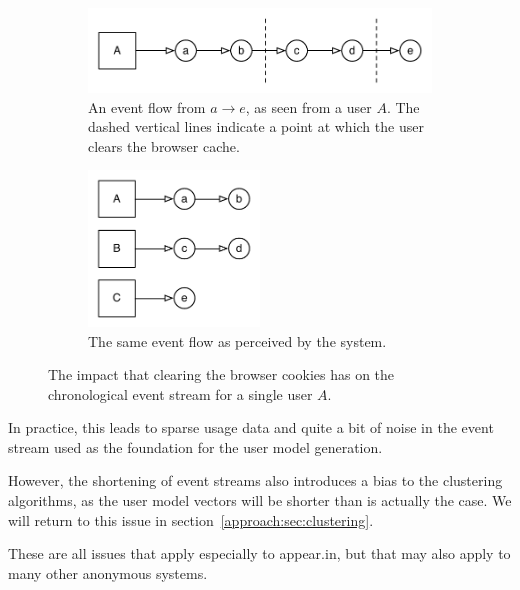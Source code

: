 \begin{figure}[h]
  \centering
    \begin{subfigure}[t]{0.8\textwidth}
      \includegraphics[width=\textwidth]{Figures/event-flow-cache-break-1}
      \caption{An event flow from $a \rightarrow e$, as seen from a user $A$. The dashed vertical lines indicate a point at which the user clears the browser cache.}
      \label{fig:cache_break1}
    \end{subfigure}
    \begin{subfigure}[t]{0.8\textwidth}
      \includegraphics[width=0.5\textwidth]{Figures/event-flow-cache-break-2}
      \caption{The same event flow as perceived by the system.}
      \label{fig:cache_break2}
    \end{subfigure}

    \caption{The impact that clearing the browser cookies has on the chronological event stream for a single user $A$.}
    \label{fig:clear_cookie_impact}
\end{figure}

In practice, this leads to sparse usage data and quite a bit of noise in the event stream used as the foundation for the user model generation.

However, the shortening of event streams also introduces a bias to the clustering algorithms, as the user model vectors will be shorter than is actually the case. We will return to this issue in section~\ref{approach:sec:clustering}.

These are all issues that apply especially to appear.in, but that may also apply to many other anonymous systems.

